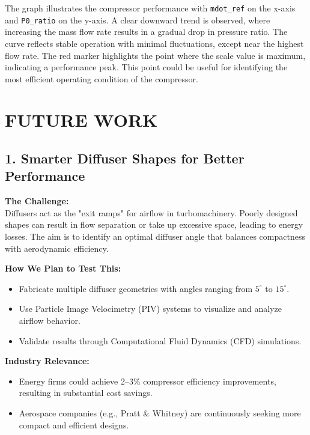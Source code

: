 \documentclass[12pt,a4paper]{article}
\begin{document}
The graph illustrates the compressor performance with \texttt{mdot\_ref} on the x-axis and \texttt{P0\_ratio} on the y-axis. A clear downward trend is observed, where increasing the mass flow rate results in a gradual drop in pressure ratio. The curve reflects stable operation with minimal fluctuations, except near the highest flow rate. The red marker highlights the point where the scale value is maximum, indicating a performance peak. This point could be useful for identifying the most efficient operating condition of the compressor.




\section*{FUTURE WORK}

\subsection*{1. Smarter Diffuser Shapes for Better Performance}

\textbf{The Challenge:} \\
Diffusers act as the "exit ramps" for airflow in turbomachinery. Poorly designed shapes can result in flow separation or take up excessive space, leading to energy losses. The aim is to identify an optimal diffuser angle that balances compactness with aerodynamic efficiency.

\vspace{0.5em}

\textbf{How We Plan to Test This:}
\begin{itemize}
    \item Fabricate multiple diffuser geometries with angles ranging from $5^\circ$ to $15^\circ$.
    \item Use Particle Image Velocimetry (PIV) systems to visualize and analyze airflow behavior.
    \item Validate results through Computational Fluid Dynamics (CFD) simulations.
\end{itemize}

\vspace{0.5em}

\textbf{Industry Relevance:}
\begin{itemize}
    \item Energy firms could achieve 2--3\% compressor efficiency improvements, resulting in substantial cost savings.
    \item Aerospace companies (e.g., Pratt \& Whitney) are continuously seeking more compact and efficient designs.
\end{itemize}
\end{document}
